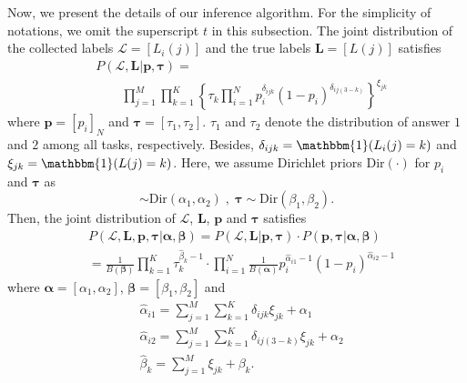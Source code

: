 
Now, we present the details of our inference algorithm. For the simplicity of notations, we omit the superscript $t$ in this subsection. The joint distribution of the collected labels $\mathcal{L}=[L_i(j)]$ and the true labels $\bm{L}=[L(j)]$ satisfies
\begin{equation}
\label{JointDist}
\begin{split}
    &P(\mathcal{L},\bm{L}| \bm{p}, \bm{\tau})=\\ &\qquad {\prod}_{j=1}^{M}{\prod}_{k=1}^{K}\left\{\tau_{k}\prod_{i=1}^{N}p_i^{\delta_{ijk}}(1-p_i)^{\delta_{ij(3-k)}} \right\}^{\xi_{jk}}
\end{split}
\end{equation}
where $\bm{p}=[p_i]_N$ and $\bm{\tau}=[\tau_1,\tau_2]$. $\tau_1$ and $\tau_2$ denote the distribution of answer $1$ and $2$ among all tasks, respectively.
Besides,  $\delta_{ijk}=\mathbbm{1}(L_i(j)=k)$ and $\xi_{jk}= \mathbbm{1}(L(j)=k)$.
Here, we assume Dirichlet priors $\textrm{Dir}(\cdot)$ for $p_i$ and $\bm{\tau}$ as
\begin{equation}
[p_{i}, 1-p_i]\sim \textrm{Dir}(\alpha_{1},\alpha_{2})\;,\; \bm{\tau}\sim \textrm{Dir}(\beta_{1},\beta_{2}).
\end{equation}
Then, the joint distribution of $\mathcal{L}$, $\bm{L}$, $\bm{p}$ and $\bm{\tau}$ satisfies
\begin{equation}
\label{JointDist2}
\begin{split}
&P(\mathcal{L},\bm{L},\bm{p}, \bm{\tau}|\bm{\alpha}, \bm{\beta})=P(\mathcal{L},\bm{L}|\bm{p}, \bm{\tau})\cdot P(\bm{p}, \bm{\tau}|\bm{\alpha}, \bm{\beta})\\
&=\frac{1}{B(\bm{\beta})}\prod_{k=1}^{K}\tau_k^{\hat{\beta}_k-1}\cdot\prod_{i=1}^{N}\frac{1}{B(\bm{\alpha})}p_i^{\hat{\alpha}_{i1}-1}(1-p_i)^{\hat{\alpha}_{i2}-1}
\end{split}
\end{equation}
where $\bm{\alpha}=[\alpha_1,\alpha_2]$, $\bm{\beta}=[\beta_1,\beta_2]$ and
\begin{equation}
\begin{split}
&\hat{\alpha}_{i1}={\sum}_{j=1}^{M}{\sum}_{k=1}^{K}\delta_{ijk}\xi_{jk}+\alpha_{1}\\
&\hat{\alpha}_{i2}={\sum}_{j=1}^{M}{\sum}_{k=1}^{K}\delta_{ij(3-k)}\xi_{jk}+\alpha_{2}\\
&\hat{\beta}_k={\sum}_{j=1}^{M}\xi_{jk}+\beta_{k}.
\end{split}
\end{equation}
